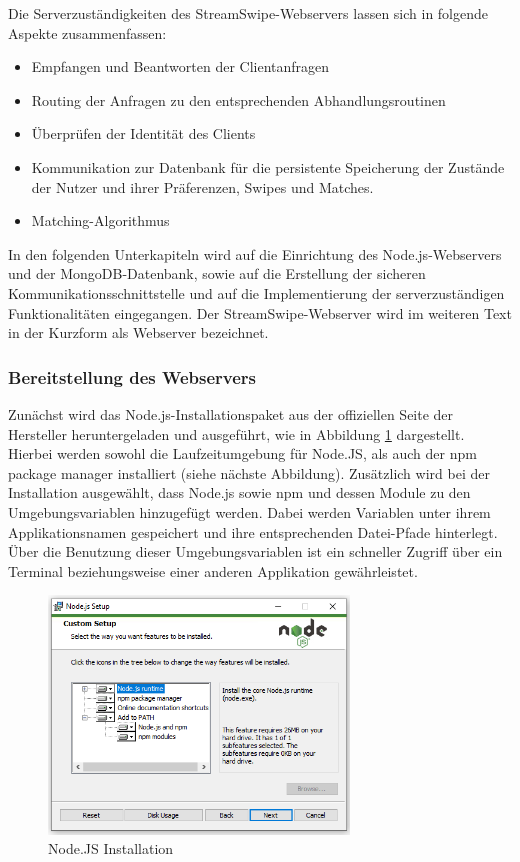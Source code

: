 Die Serverzuständigkeiten des StreamSwipe-Webservers lassen sich in folgende Aspekte zusammenfassen:
\begin{itemize}
\item Empfangen und Beantworten der Clientanfragen
\item Routing der Anfragen zu den entsprechenden Abhandlungsroutinen
\item Überprüfen der Identität des Clients
\item Kommunikation zur Datenbank für die persistente Speicherung der Zustände der Nutzer und ihrer Präferenzen, Swipes und Matches.
\item Matching-Algorithmus
\end{itemize} 

\noindent
In den folgenden Unterkapiteln wird auf die Einrichtung des Node.js-Webservers und der MongoDB-Datenbank, sowie auf die Erstellung der sicheren Kommunikationsschnittstelle und auf die Implementierung der serverzuständigen Funktionalitäten eingegangen. Der StreamSwipe-Webserver wird im weiteren Text in der Kurzform als Webserver bezeichnet. 

\subsubsection{Bereitstellung des Webservers}
Zunächst wird das Node.js-Installationspaket aus der offiziellen Seite der Hersteller heruntergeladen und ausgeführt, wie in Abbildung \ref{fig:installation_nodejs} dargestellt. Hierbei werden sowohl die Laufzeitumgebung für Node.JS, als auch der npm package manager installiert (siehe nächste Abbildung). 
Zusätzlich wird bei der Installation ausgewählt, dass Node.js sowie npm und dessen Module zu den Umgebungsvariablen hinzugefügt werden. Dabei werden Variablen unter ihrem Applikationsnamen gespeichert und ihre entsprechenden Datei-Pfade hinterlegt.
Über die Benutzung dieser Umgebungsvariablen ist ein schneller Zugriff über ein Terminal beziehungsweise einer anderen Applikation gewährleistet.


\begin{figure}[tbt]
\centering
\includegraphics[width=8cm]{images/nodejs_install.png}
\caption{Node.JS Installation}
\label{fig:installation_nodejs}
\end{figure}

